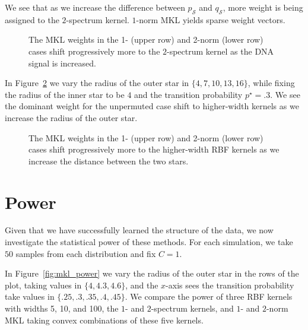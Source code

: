 We see that as we increase the difference between $p_{\mathcal{S}}$ and $q_{\mathcal{S}}$,
more weight is being assigned to the $2$-spectrum kernel.  $1$-norm MKL yields sparse weight
vectors.
\begin{figure}
  \begin{center}
    \resizebox{14.0cm}{!}{
      
    }
  \end{center}
\caption{The MKL weights in the 1- (upper row) and 2-norm (lower row) cases shift progressively more to
  the $2$-spectrum kernel as the DNA signal is increased.}
\label{fig:mkl_weights1}
\end{figure}

In Figure~\ref{fig:mkl_weights2} we vary the radius of the outer star in $\{4, 7, 10, 13, 16\}$,
while fixing the radius of the inner star to be $4$ and the transition probability $p^{\star} = .3$.
We see the dominant weight for the unpermuted case shift to higher-width kernels as we increase
the radius of the outer star.
\begin{figure}
  \begin{center}
    \resizebox{14.0cm}{!}{
      
    }
  \end{center}
\caption{The MKL weights in the 1- (upper row) and 2-norm (lower row) cases shift progressively more to
  the higher-width RBF kernels as we increase the distance between the two stars.}
\label{fig:mkl_weights2}
\end{figure}

\section{Power}
Given that we have successfully learned the structure of the data, we now
investigate the statistical power of these methods.  For each simulation, we take
$50$ samples from each distribution and fix $C = 1$.

In Figure~\ref{fig:mkl_power} we vary the radius of the outer star in the rows of the plot,
taking values in $\{4, 4.3, 4.6\}$, and the $x$-axis sees the transition probability
take values in $\{.25, .3, .35, .4, .45\}$.  We compare the power of three RBF kernels
with widths 5, 10, and 100, the $1$- and $2$-spectrum kernels, and $1$- and $2$-norm MKL
taking convex combinations of these five kernels.

